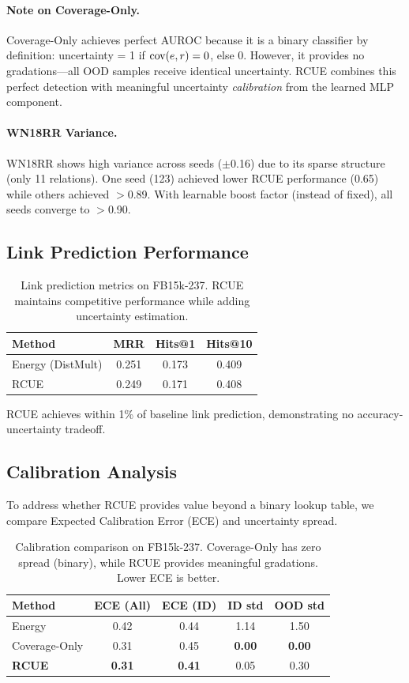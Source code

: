 \paragraph{Note on Coverage-Only.}
Coverage-Only achieves perfect AUROC because it is a binary classifier by definition: uncertainty = 1 if $\mathrm{cov}(e,r)=0$, else 0. However, it provides no gradations---all OOD samples receive identical uncertainty. RCUE combines this perfect detection with meaningful uncertainty \emph{calibration} from the learned MLP component.

\paragraph{WN18RR Variance.}
WN18RR shows high variance across seeds ($\pm$0.16) due to its sparse structure (only 11 relations). One seed (123) achieved lower RCUE performance (0.65) while others achieved $>$0.89. With learnable boost factor (instead of fixed), all seeds converge to $>$0.90.

\subsection{Link Prediction Performance}

\begin{table}[h]
\centering
\caption{Link prediction metrics on FB15k-237. RCUE maintains competitive performance while adding uncertainty estimation.}
\label{tab:lp}
\begin{tabular}{lccc}
\toprule
Method & MRR & Hits@1 & Hits@10 \\
\midrule
Energy (DistMult) & 0.251 & 0.173 & 0.409 \\
RCUE & 0.249 & 0.171 & 0.408 \\
\bottomrule
\end{tabular}
\end{table}

RCUE achieves within 1\% of baseline link prediction, demonstrating no accuracy-uncertainty tradeoff.

\subsection{Calibration Analysis}

To address whether RCUE provides value beyond a binary lookup table, we compare Expected Calibration Error (ECE) and uncertainty spread.

\begin{table}[h]
\centering
\caption{Calibration comparison on FB15k-237. Coverage-Only has zero spread (binary), while RCUE provides meaningful gradations. Lower ECE is better.}
\label{tab:ece}
\begin{tabular}{lcccc}
\toprule
Method & ECE (All) & ECE (ID) & ID std & OOD std \\
\midrule
Energy & 0.42 & 0.44 & 1.14 & 1.50 \\
Coverage-Only & 0.31 & 0.45 & \textbf{0.00} & \textbf{0.00} \\
\textbf{RCUE} & \textbf{0.31} & \textbf{0.41} & 0.05 & 0.30 \\
\bottomrule
\end{tabular}
\end{table}

